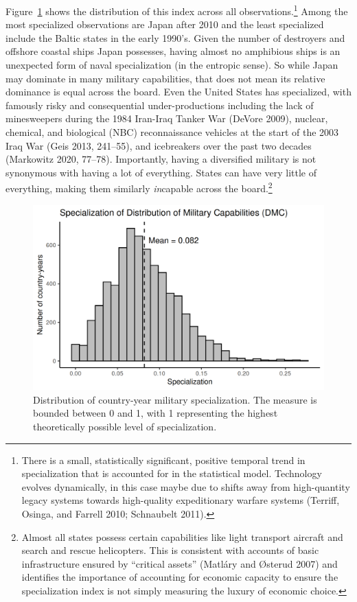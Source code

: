 \documentclass[
  12,
  letterpaper,
  DIV=11,
  numbers=noendperiod]{scrartcl}
\begin{document}
Figure~\ref{fig-spec_scores} shows the distribution of this index across
all observations.\footnote{There is a small, statistically significant,
  positive temporal trend in specialization that is accounted for in the
  statistical model. Technology evolves dynamically, in this case maybe
  due to shifts away from high-quantity legacy systems towards
  high-quality expeditionary warfare systems (Terriff, Osinga, and
  Farrell 2010; Schnaubelt 2011).} Among the most specialized
observations are Japan after 2010 and the least specialized include the
Baltic states in the early 1990's. Given the number of destroyers and
offshore coastal ships Japan possesses, having almost no amphibious
ships is an unexpected form of naval specialization (in the entropic
sense). So while Japan may dominate in many military capabilities, that
does not mean its relative dominance is equal across the board. Even the
United States has specialized, with famously risky and consequential
under-productions including the lack of minesweepers during the 1984
Iran-Iraq Tanker War (DeVore 2009), nuclear, chemical, and biological
(NBC) reconnaissance vehicles at the start of the 2003 Iraq War (Geis
2013, 241--55), and icebreakers over the past two decades (Markowitz
2020, 77--78). Importantly, having a diversified military is not
synonymous with having a lot of everything. States can have very little
of everything, making them similarly \emph{in}capable across the
board.\footnote{Almost all states possess certain capabilities like
  light transport aircraft and search and rescue helicopters. This is
  consistent with accounts of basic infrastructure ensured by ``critical
  assets'' (Matláry and Østerud 2007) and identifies the importance of
  accounting for economic capacity to ensure the specialization index is
  not simply measuring the luxury of economic choice.}

\begin{figure}[h]

{\centering \includegraphics{2023-07-13_Specialization_files/figure-pdf/fig-spec_scores-1.png}

}

\caption{\label{fig-spec_scores}Distribution of country-year military
specialization. The measure is bounded between 0 and 1, with 1
representing the highest theoretically possible level of
specialization.}

\end{figure}
\end{document}
